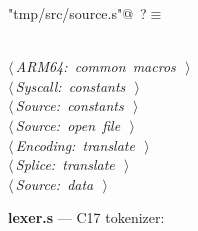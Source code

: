 \documentclass[11pt,a4paper,twoside,openright,DIV=15]{scrbook}
\theoremstyle{definition}
\theoremstyle{plain}
\theoremstyle{remark}
\begin{document}
\begin{flushleft} \small
\begin{minipage}{\linewidth}\label{scrap94}\raggedright\small
{} \verb@"tmp/src/source.s"@\nobreak\ {\footnotesize {?}}$\equiv$
\vspace{-1ex}
\begin{list}{}{} \item
\mbox{}\verb@@\\
\mbox{}\verb@@\hbox{$\langle\,${\itshape ARM64: common macros}\nobreak\ {\footnotesize {}}$\,\rangle$}\verb@@\\
\mbox{}\verb@@\hbox{$\langle\,${\itshape Syscall: constants}\nobreak\ {\footnotesize {}}$\,\rangle$}\verb@@\\
\mbox{}\verb@@\hbox{$\langle\,${\itshape Source: constants}\nobreak\ {\footnotesize {}}$\,\rangle$}\verb@@\\
\mbox{}\verb@@\hbox{$\langle\,${\itshape Source: open file}\nobreak\ {\footnotesize {}}$\,\rangle$}\verb@@\\
\mbox{}\verb@@\hbox{$\langle\,${\itshape Encoding: translate}\nobreak\ {\footnotesize {}}$\,\rangle$}\verb@@\\
\mbox{}\verb@@\hbox{$\langle\,${\itshape Splice: translate}\nobreak\ {\footnotesize {}}$\,\rangle$}\verb@@\\
\mbox{}\verb@@\hbox{$\langle\,${\itshape Source: data}\nobreak\ {\footnotesize {}}$\,\rangle$}\verb@@\\
\mbox{}\verb@@{\NWsep}
\end{list}
\vspace{-1.5ex}
\footnotesize
\begin{list}{}{\setlength{\itemsep}{-\parsep}\setlength{\itemindent}{-\leftmargin}}

\item{}
\end{list}
\end{minipage}\vspace{4ex}
\end{flushleft}
\noindent\textbf{lexer.s} --- C17 tokenizer:
\end{document}
